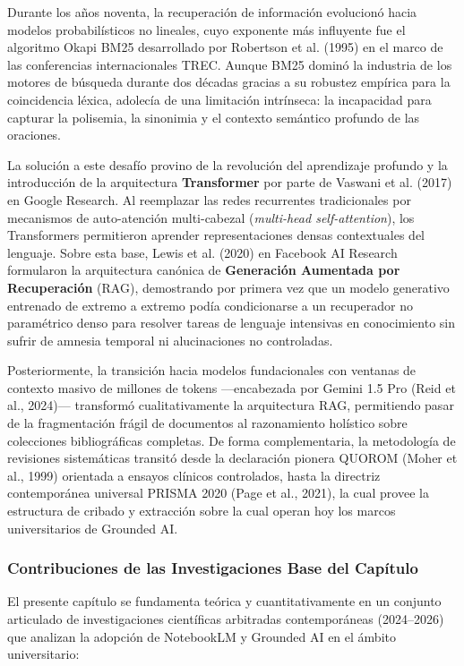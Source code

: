 Durante los años noventa, la recuperación de información evolucionó hacia modelos probabilísticos no lineales, cuyo exponente más influyente fue el algoritmo Okapi BM25 desarrollado por Robertson et al. (1995) en el marco de las conferencias internacionales TREC. Aunque BM25 dominó la industria de los motores de búsqueda durante dos décadas gracias a su robustez empírica para la coincidencia léxica, adolecía de una limitación intrínseca: la incapacidad para capturar la polisemia, la sinonimia y el contexto semántico profundo de las oraciones.

La solución a este desafío provino de la revolución del aprendizaje profundo y la introducción de la arquitectura \textbf{Transformer} por parte de Vaswani et al. (2017) en Google Research. Al reemplazar las redes recurrentes tradicionales por mecanismos de auto-atención multi-cabezal (\textit{multi-head self-attention}), los Transformers permitieron aprender representaciones densas contextuales del lenguaje. Sobre esta base, Lewis et al. (2020) en Facebook AI Research formularon la arquitectura canónica de \textbf{Generación Aumentada por Recuperación} (RAG), demostrando por primera vez que un modelo generativo entrenado de extremo a extremo podía condicionarse a un recuperador no paramétrico denso para resolver tareas de lenguaje intensivas en conocimiento sin sufrir de amnesia temporal ni alucinaciones no controladas.

Posteriormente, la transición hacia modelos fundacionales con ventanas de contexto masivo de millones de tokens ---encabezada por Gemini 1.5 Pro (Reid et al., 2024)--- transformó cualitativamente la arquitectura RAG, permitiendo pasar de la fragmentación frágil de documentos al razonamiento holístico sobre colecciones bibliográficas completas. De forma complementaria, la metodología de revisiones sistemáticas transitó desde la declaración pionera QUOROM (Moher et al., 1999) orientada a ensayos clínicos controlados, hasta la directriz contemporánea universal PRISMA 2020 (Page et al., 2021), la cual provee la estructura de cribado y extracción sobre la cual operan hoy los marcos universitarios de Grounded AI.

\subsubsection*{Contribuciones de las Investigaciones Base del Capítulo}

El presente capítulo se fundamenta teórica y cuantitativamente en un conjunto articulado de investigaciones científicas arbitradas contemporáneas (2024--2026) que analizan la adopción de NotebookLM y Grounded AI en el ámbito universitario:

